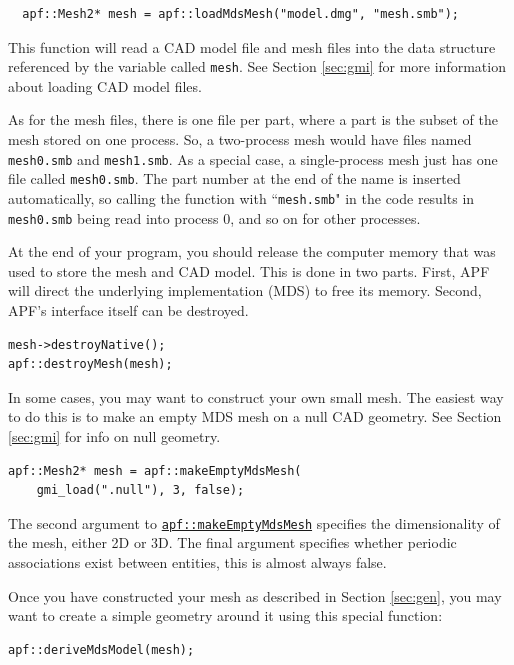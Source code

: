 \documentclass{article}
\begin{document}
\begin{lstlisting}
  apf::Mesh2* mesh = apf::loadMdsMesh("model.dmg", "mesh.smb");
\end{lstlisting}

This function will read a CAD model file and mesh files into
the data structure referenced by the variable called \texttt{mesh}.
See Section \ref{sec:gmi} for more information about loading
CAD model files.

As for the mesh files, there is one file per part, where a
part is the subset of the mesh stored on one process.
So, a two-process mesh would have files named \texttt{mesh0.smb}
and \texttt{mesh1.smb}.
As a special case, a single-process mesh just has one file
called \texttt{mesh0.smb}.
The part number at the end of the name is inserted automatically,
so calling the function with ``\texttt{mesh.smb}" in the code
results in \texttt{mesh0.smb} being read into process 0, and so
on for other processes.

At the end of your program, you should release the computer
memory that was used to store the mesh and CAD model.
This is done in two parts.
First, APF will direct the underlying implementation (MDS)
to free its memory.
Second, APF's interface itself can be destroyed.

\begin{lstlisting}
mesh->destroyNative();
apf::destroyMesh(mesh);
\end{lstlisting}

In some cases, you may want to construct your own small mesh.
The easiest way to do this is to make an empty MDS mesh
on a null CAD geometry.
See Section \ref{sec:gmi} for info on null geometry.

\begin{lstlisting}
apf::Mesh2* mesh = apf::makeEmptyMdsMesh(
    gmi_load(".null"), 3, false);
\end{lstlisting}

The second argument to
\href{http://scorec.rpi.edu/~dibanez/core/namespaceapf.html#a11b743b52ed63a172a9f6bf5f29e2054}{\texttt{apf::makeEmptyMdsMesh}}
specifies the dimensionality of the mesh, either 2D or 3D.
The final argument specifies whether periodic associations
exist between entities, this is almost always false.

Once you have constructed your mesh as described in Section \ref{sec:gen},
you may want to create a simple geometry around it using
this special function:

\begin{lstlisting}
apf::deriveMdsModel(mesh);
\end{lstlisting}
\end{document}
